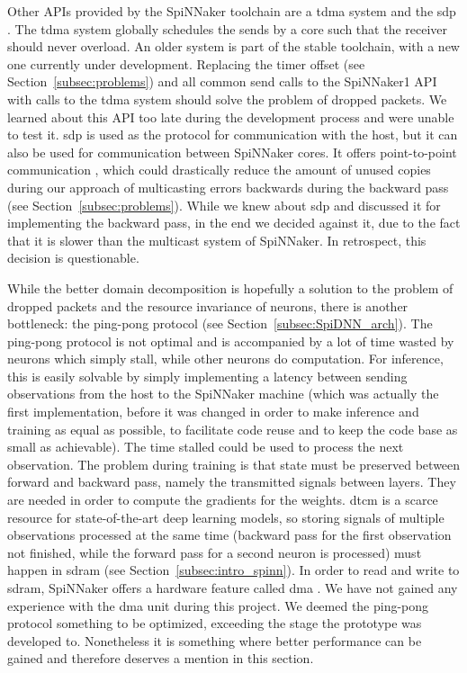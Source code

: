 \documentclass[]{article}
\begin{document}
Other APIs provided by the SpiNNaker toolchain are a \acrfull{tdma}
system and the \acrfull{sdp} \citep{furber_et_al_2014}.
The \acrshort{tdma} system globally schedules the sends by a core such that the
receiver should never overload.
An older system is part of the stable toolchain, with a new one
currently under development.
Replacing the timer offset (see Section~\ref{subsec:problems}) and all
common send calls to the SpiNNaker1 API with calls to the \acrshort{tdma} system
should solve the problem of dropped packets.
We learned about this API too late during the development process
and were unable to test it.
\acrshort{sdp} is used as the protocol for communication with the host, but it
can also be used for communication between SpiNNaker cores.
It offers point-to-point communication \citep{furber_et_al_2014},
which could drastically reduce the amount of unused copies during our
approach of multicasting errors backwards during the backward pass
(see Section~\ref{subsec:problems}).
While we knew about \acrshort{sdp} and discussed it for implementing the backward
pass, in the end we decided against it, due to the fact that it is
slower than the multicast system of SpiNNaker.
In retrospect, this decision is questionable.

While the better domain decomposition is hopefully a solution
to the problem of dropped packets and the resource invariance of
neurons, there is another bottleneck: the ping-pong protocol
(see Section~\ref{subsec:SpiDNN_arch}).
The ping-pong protocol is not optimal and is accompanied by a lot
of time wasted by neurons which simply stall, while other neurons
do computation.
For inference, this is easily solvable by simply implementing a
latency between sending observations from the host to the SpiNNaker
machine (which was actually the first implementation, before it was
changed in order to make inference and training as equal as possible,
to facilitate code reuse and to keep the code base as small as
achievable).
The time stalled could be used to process the next observation.
The problem during training is that state must be preserved between
forward and backward pass, namely the transmitted signals between
layers.
They are needed in order to compute the gradients for the weights.
\acrshort{dtcm} is a scarce resource for state-of-the-art deep learning models,
so storing signals of multiple observations processed at the same time
(backward pass for the first observation not finished, while the
forward pass for a second neuron is processed) must happen in \acrshort{sdram}
(see Section~\ref{subsec:intro_spinn}).
In order to read and write to \acrshort{sdram}, SpiNNaker offers a hardware
feature called \acrfull{dma} \citep{furber_et_al_2020}.
We have not gained any experience with the \acrshort{dma} unit during this
project.
We deemed the ping-pong protocol something to be optimized,
exceeding the stage the prototype was developed to.
Nonetheless it is something where better performance can be gained
and therefore deserves a mention in this section.
\end{document}
